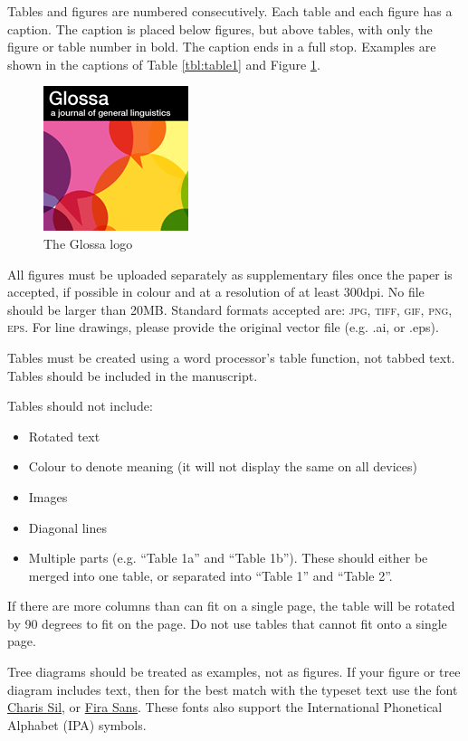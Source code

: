 \documentclass[charis,linguex]{glossa}
\begin{document}
Tables and figures are numbered consecutively. Each table and each figure has a caption. The caption is placed below figures, but above tables, with only the figure or table number in bold. The caption ends in a full stop. Examples are shown in the captions of Table \ref{tbl:table1} and Figure \ref{fig:glossalogo}. 

\begin{figure}[h]
\centering
\includegraphics{glossa}
\caption{The Glossa logo}
\label{fig:glossalogo}
\end{figure}

All figures must be uploaded separately as supplementary files once the paper is accepted, if possible in colour and at a resolution of at least 300dpi. No file should be larger than 20MB. Standard formats accepted are: \textsc{jpg, tiff, gif, png, eps}. For line drawings, please provide the original vector file (e.g. .ai, or .eps).

Tables must be created using a word processor's table function, not tabbed text. Tables should be included in the manuscript. 

Tables should not include:

\begin{itemize}
\item Rotated text
\item Colour to denote meaning (it will not display the same on all devices)
\item Images
\item Diagonal lines
\item Multiple parts (e.g. ``Table 1a'' and ``Table 1b''). These should either be merged into one table, or separated into ``Table 1'' and ``Table 2''.
\end{itemize}
If there are more columns than can fit on a single page, the table will be rotated by 90 degrees to fit on the page. Do not use tables that cannot fit onto a single page.

Tree diagrams should be treated as examples, not as figures. If your figure or tree diagram includes text, then for the best match with the typeset text use the font \href{https://software.sil.org/charis/download/}{Charis Sil}, or \href{https://www.fontsquirrel.com/fonts/fira-sans}{Fira Sans}. These fonts also support the International Phonetical Alphabet (IPA) symbols.
\end{document}

